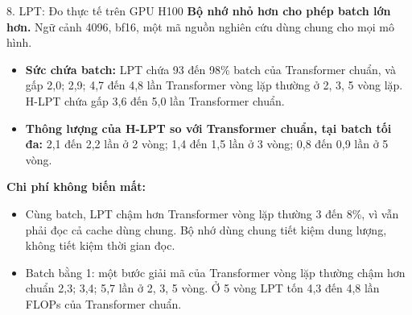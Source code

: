 \begin{frame}{8. LPT: Đo thực tế trên GPU H100}
    \textbf{Bộ nhớ nhỏ hơn cho phép batch lớn hơn.} Ngữ cảnh 4096, bf16, một mã nguồn nghiên cứu dùng chung cho mọi mô hình.
    \begin{itemize}
        \item \textbf{Sức chứa batch:} LPT chứa 93 đến 98\% batch của Transformer chuẩn, và gấp 2,0; 2,9; 4,7 đến 4,8 lần Transformer vòng lặp thường ở 2, 3, 5 vòng lặp. H-LPT chứa gấp 3,6 đến 5,0 lần Transformer chuẩn.
        \item \textbf{Thông lượng của H-LPT so với Transformer chuẩn, tại batch tối đa:} 2,1 đến 2,2 lần ở 2 vòng; 1,4 đến 1,5 lần ở 3 vòng; 0,8 đến 0,9 lần ở 5 vòng.
    \end{itemize}
    \vspace{0.1cm}
    \textbf{Chi phí không biến mất:}
    \begin{itemize}
        \item Cùng batch, LPT chậm hơn Transformer vòng lặp thường 3 đến 8\%, vì vẫn phải đọc cả cache dùng chung. Bộ nhớ dùng chung tiết kiệm dung lượng, không tiết kiệm thời gian đọc.
        \item Batch bằng 1: một bước giải mã của Transformer vòng lặp thường chậm hơn chuẩn 2,3; 3,4; 5,7 lần ở 2, 3, 5 vòng. Ở 5 vòng LPT tốn 4,3 đến 4,8 lần FLOPs của Transformer chuẩn.
    \end{itemize}
\end{frame}

